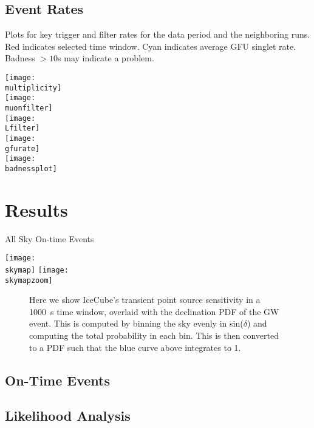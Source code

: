 \documentclass[titlepage]{article}
\begin{document}
\pagebreak
\subsection{Event Rates}
Plots for key trigger and filter rates for the data period
and the neighboring runs.  Red indicates selected time window.
Cyan indicates average GFU singlet rate. Badness $>10$s may indicate
a problem.

\vspace{1em}
{
 \centering
 \texttt{[image: \\multiplicity]}\\
 \texttt{[image: \\muonfilter]}\\
 \texttt{[image: \\Lfilter]}\\
 \texttt{[image: \\gfurate]}\\
 \texttt{[image: \\badnessplot]}
}
\vspace{2cm}

\pagebreak

\section{Results}

{
  \centering
  {\Large All Sky On-time Events}

  \texttt{[image: \\skymap]}
  \vspace{3cm}
  \texttt{[image: \\skymapzoom]}
}

\begin{figure}
    \centering
    \decPDF
    \caption{Here we show IceCube's transient point source sensitivity in a 1000~s time window, overlaid with the declination PDF of the GW event. This is computed by binning the sky evenly in sin($\delta$) and computing the total probability in each bin. This is then converted to a PDF such that the blue curve above integrates to 1.}
\end{figure}

\newpage
\subsection{On-Time Events}
\event

\subsection{Likelihood Analysis}
\results

\tsd
\end{document}
